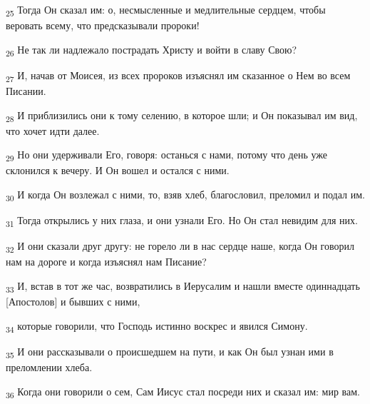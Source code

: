 \begin{tcolorbox}
\textsubscript{25} Тогда Он сказал им: о, несмысленные и медлительные сердцем, чтобы веровать всему, что предсказывали пророки!
\end{tcolorbox}
\begin{tcolorbox}
\textsubscript{26} Не так ли надлежало пострадать Христу и войти в славу Свою?
\end{tcolorbox}
\begin{tcolorbox}
\textsubscript{27} И, начав от Моисея, из всех пророков изъяснял им сказанное о Нем во всем Писании.
\end{tcolorbox}
\begin{tcolorbox}
\textsubscript{28} И приблизились они к тому селению, в которое шли; и Он показывал им вид, что хочет идти далее.
\end{tcolorbox}
\begin{tcolorbox}
\textsubscript{29} Но они удерживали Его, говоря: останься с нами, потому что день уже склонился к вечеру. И Он вошел и остался с ними.
\end{tcolorbox}
\begin{tcolorbox}
\textsubscript{30} И когда Он возлежал с ними, то, взяв хлеб, благословил, преломил и подал им.
\end{tcolorbox}
\begin{tcolorbox}
\textsubscript{31} Тогда открылись у них глаза, и они узнали Его. Но Он стал невидим для них.
\end{tcolorbox}
\begin{tcolorbox}
\textsubscript{32} И они сказали друг другу: не горело ли в нас сердце наше, когда Он говорил нам на дороге и когда изъяснял нам Писание?
\end{tcolorbox}
\begin{tcolorbox}
\textsubscript{33} И, встав в тот же час, возвратились в Иерусалим и нашли вместе одиннадцать [Апостолов] и бывших с ними,
\end{tcolorbox}
\begin{tcolorbox}
\textsubscript{34} которые говорили, что Господь истинно воскрес и явился Симону.
\end{tcolorbox}
\begin{tcolorbox}
\textsubscript{35} И они рассказывали о происшедшем на пути, и как Он был узнан ими в преломлении хлеба.
\end{tcolorbox}
\begin{tcolorbox}
\textsubscript{36} Когда они говорили о сем, Сам Иисус стал посреди них и сказал им: мир вам.
\end{tcolorbox}
